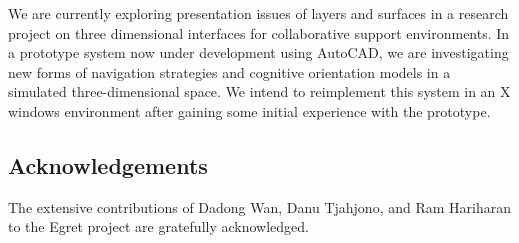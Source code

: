 We are currently exploring presentation issues of layers and
surfaces in a research project on three dimensional interfaces for
collaborative support environments.  In a prototype system now under
development using AutoCAD, we are investigating new forms of
navigation strategies and cognitive orientation models in a simulated
three-dimensional space.  We intend to reimplement this system in 
an X windows environment after gaining some initial experience with the 
prototype.


\subsection*{Acknowledgements}

The extensive contributions of Dadong Wan, Danu Tjahjono, and Ram
Hariharan to the Egret project are gratefully
acknowledged.




 








